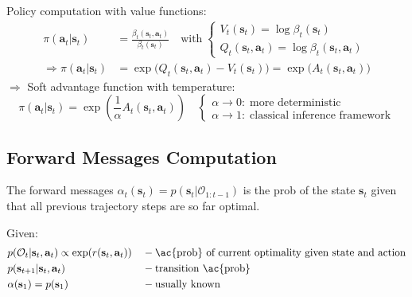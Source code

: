Policy computation with value functions:
\begin{align}
	\pi(\textbf{a}_t | \textbf{s}_t) &= \frac{\beta_t (\textbf{s}_t, \textbf{a}_t)}{\beta_t (\textbf{s}_t)} \quad \text{with}\;\begin{cases}
		V_t(\textbf{s}_t) = \log \beta_t (\textbf{s}_t)\\
		Q_t(\textbf{s}_t, \textbf{a}_t) = \log \beta_t (\textbf{s}_t, \textbf{a}_t)
	\end{cases}\\
	\Rightarrow \pi(\textbf{a}_t | \textbf{s}_t) &= \exp \big(Q_t(\textbf{s}_t, \textbf{a}_t) - V_t(\textbf{s}_t)\big) = \exp \big( A_t(\textbf{s}_t, \textbf{a}_t)\big)
\end{align}
$\Rightarrow$ Soft advantage function with temperature:
\begin{equation}
	\pi(\textbf{a}_t | \textbf{s}_t) = \exp \left(\frac{1}{\alpha} A_t(\textbf{s}_t, \textbf{a}_t)\right) \quad \begin{cases}
		\alpha \rightarrow 0:\; \text{more deterministic}\\
		\alpha \rightarrow 1:\; \text{classical inference framework}
\end{cases}
\end{equation}

\subsection{Forward Messages Computation}
The forward messages $\alpha_t(\textbf{s}_t) = p(\textbf{s}_t | \mathcal{O}_{1:t-1})$ is the \ac{prob} of the state $\textbf{s}_t$ given that all previous trajectory steps are so far optimal.

Given:
\begin{align*}
	&p(\mathcal{O}_t| \textbf{s}_t, \textbf{a}_t) \propto \exp (r(\textbf{s}_t, \textbf{a}_t)) && -\text{\ac{prob} of current optimality given state and action}\\
	&p(\textbf{s}_{t+1} | \textbf{s}_t, \textbf{a}_t) && -\text{transition \ac{prob}}\\
	&\alpha(\textbf{s}_1) = p(\textbf{s}_1) && -\text{usually known}
\end{align*}

